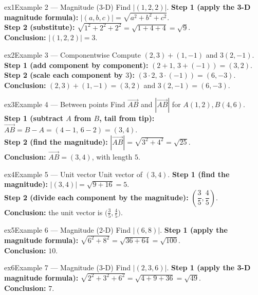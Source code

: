 \documentclass[11pt]{article}
\begin{document}
\begin{example}{ex1}{Example 2 --- Magnitude (3-D)}
Find $|(1,2,2)|$.\soln
\textbf{Step 1 (apply the 3-D magnitude formula):} $|(a,b,c)|=\sqrt{a^2+b^2+c^2}$.\\[3pt]
\textbf{Step 2 (substitute):} $\sqrt{1^2+2^2+2^2}=\sqrt{1+4+4}=\sqrt9$.\\[3pt]
\textbf{Conclusion:} $|(1,2,2)|=3$.
\end{example}

\begin{example}{ex2}{Example 3 --- Componentwise}
Compute $(2,3)+(1,-1)$ and $3(2,-1)$.\soln
\textbf{Step 1 (add component by component):} $(2+1,\,3+(-1))=(3,2)$.\\[3pt]
\textbf{Step 2 (scale each component by $3$):} $(3\cdot2,\,3\cdot(-1))=(6,-3)$.\\[3pt]
\textbf{Conclusion:} $(2,3)+(1,-1)=(3,2)$ and $3(2,-1)=(6,-3)$.
\end{example}

\begin{example}{ex3}{Example 4 --- Between points}
Find $\vec{AB}$ and $|\vec{AB}|$ for $A(1,2),B(4,6)$.\soln
\textbf{Step 1 (subtract $A$ from $B$, tail from tip):} $\vec{AB}=B-A=(4-1,\,6-2)=(3,4)$.\\[3pt]
\textbf{Step 2 (find the magnitude):} $|\vec{AB}|=\sqrt{3^2+4^2}=\sqrt{25}$.\\[3pt]
\textbf{Conclusion:} $\vec{AB}=(3,4)$, with length $5$.
\end{example}

\begin{example}{ex4}{Example 5 --- Unit vector}
Unit vector of $(3,4)$.\soln
\textbf{Step 1 (find the magnitude):} $|(3,4)|=\sqrt{9+16}=5$.\\[3pt]
\textbf{Step 2 (divide each component by the magnitude):} $\left(\dfrac35,\dfrac45\right)$.\\[3pt]
\textbf{Conclusion:} the unit vector is $\big(\tfrac35,\tfrac45\big)$.
\end{example}

\begin{example}{ex5}{Example 6 --- Magnitude (2-D)}
Find $|(6,8)|$.\soln
\textbf{Step 1 (apply the magnitude formula):} $\sqrt{6^2+8^2}=\sqrt{36+64}=\sqrt{100}$.\\[3pt]
\textbf{Conclusion:} $10$.
\end{example}

\begin{example}{ex6}{Example 7 --- Magnitude (3-D)}
Find $|(2,3,6)|$.\soln
\textbf{Step 1 (apply the 3-D magnitude formula):} $\sqrt{2^2+3^2+6^2}=\sqrt{4+9+36}=\sqrt{49}$.\\[3pt]
\textbf{Conclusion:} $7$.
\end{example}
\end{document}
